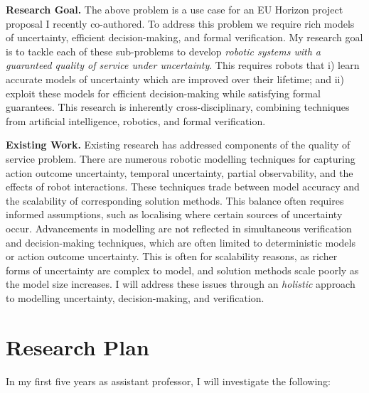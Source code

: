 \documentclass[12pt]{article}
\begin{document}
%
%
%


\vspace*{1ex}\noindent\textbf{Research Goal.} The above problem is a use case for an EU Horizon project proposal I recently co-authored.
%
To address this problem we require rich models of uncertainty, efficient decision-making, and formal verification.
%
My research goal is to tackle each of these sub-problems to develop \emph{robotic systems with a guaranteed quality of service under uncertainty}.
%
This requires robots that i) learn accurate models of uncertainty which are improved over their lifetime; and ii) exploit these models for efficient decision-making while satisfying formal guarantees.
%
This research is inherently cross-disciplinary, combining techniques from artificial intelligence, robotics, and formal verification.

\vspace*{1ex}\noindent\textbf{Existing Work.} Existing research has addressed components of the quality of service problem.
%
There are numerous robotic modelling techniques for capturing action outcome uncertainty, temporal uncertainty, partial observability, and the effects of robot interactions.
%
These techniques trade between model accuracy and the scalability of corresponding solution methods.
%
This balance often requires informed assumptions, such as localising where certain sources of uncertainty occur.
%
Advancements in modelling are not reflected in simultaneous verification and decision-making techniques, which are often limited to deterministic models or action outcome uncertainty.
%
This is often for scalability reasons, as richer forms of uncertainty are complex to model, and solution methods scale poorly as the model size increases.
%
I will address these issues through an \emph{holistic} approach to modelling uncertainty, decision-making, and verification.

\section*{Research Plan}

In my first five years as assistant professor, I will investigate the following:
\end{document}
